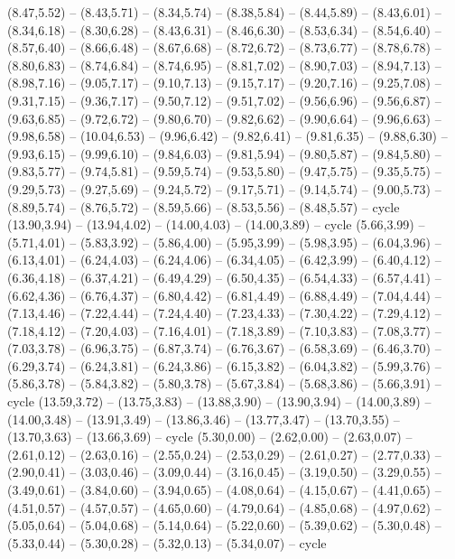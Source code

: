 \expandafter\def\csname geo:gebiet:BLR\endcsname{
  (8.47,5.52) -- (8.43,5.71) -- (8.34,5.74) -- (8.38,5.84) -- (8.44,5.89) -- (8.43,6.01) -- (8.34,6.18) -- (8.30,6.28) -- (8.43,6.31) -- (8.46,6.30) -- (8.53,6.34) -- (8.54,6.40) -- (8.57,6.40) -- (8.66,6.48) -- (8.67,6.68) -- (8.72,6.72) -- (8.73,6.77) -- (8.78,6.78) -- (8.80,6.83) -- (8.74,6.84) -- (8.74,6.95) -- (8.81,7.02) -- (8.90,7.03) -- (8.94,7.13) -- (8.98,7.16) -- (9.05,7.17) -- (9.10,7.13) -- (9.15,7.17) -- (9.20,7.16) -- (9.25,7.08) -- (9.31,7.15) -- (9.36,7.17) -- (9.50,7.12) -- (9.51,7.02) -- (9.56,6.96) -- (9.56,6.87) -- (9.63,6.85) -- (9.72,6.72) -- (9.80,6.70) -- (9.82,6.62) -- (9.90,6.64) -- (9.96,6.63) -- (9.98,6.58) -- (10.04,6.53) -- (9.96,6.42) -- (9.82,6.41) -- (9.81,6.35) -- (9.88,6.30) -- (9.93,6.15) -- (9.99,6.10) -- (9.84,6.03) -- (9.81,5.94) -- (9.80,5.87) -- (9.84,5.80) -- (9.83,5.77) -- (9.74,5.81) -- (9.59,5.74) -- (9.53,5.80) -- (9.47,5.75) -- (9.35,5.75) -- (9.29,5.73) -- (9.27,5.69) -- (9.24,5.72) -- (9.17,5.71) -- (9.14,5.74) -- (9.00,5.73) -- (8.89,5.74) -- (8.76,5.72) -- (8.59,5.66) -- (8.53,5.56) -- (8.48,5.57) -- cycle}
\expandafter\def\csname geo:gebiet:AZE\endcsname{
  (13.90,3.94) -- (13.94,4.02) -- (14.00,4.03) -- (14.00,3.89) -- cycle}
\expandafter\def\csname geo:gebiet:AUT\endcsname{
  (5.66,3.99) -- (5.71,4.01) -- (5.83,3.92) -- (5.86,4.00) -- (5.95,3.99) -- (5.98,3.95) -- (6.04,3.96) -- (6.13,4.01) -- (6.24,4.03) -- (6.24,4.06) -- (6.34,4.05) -- (6.42,3.99) -- (6.40,4.12) -- (6.36,4.18) -- (6.37,4.21) -- (6.49,4.29) -- (6.50,4.35) -- (6.54,4.33) -- (6.57,4.41) -- (6.62,4.36) -- (6.76,4.37) -- (6.80,4.42) -- (6.81,4.49) -- (6.88,4.49) -- (7.04,4.44) -- (7.13,4.46) -- (7.22,4.44) -- (7.24,4.40) -- (7.23,4.33) -- (7.30,4.22) -- (7.29,4.12) -- (7.18,4.12) -- (7.20,4.03) -- (7.16,4.01) -- (7.18,3.89) -- (7.10,3.83) -- (7.08,3.77) -- (7.03,3.78) -- (6.96,3.75) -- (6.87,3.74) -- (6.76,3.67) -- (6.58,3.69) -- (6.46,3.70) -- (6.29,3.74) -- (6.24,3.81) -- (6.24,3.86) -- (6.15,3.82) -- (6.04,3.82) -- (5.99,3.76) -- (5.86,3.78) -- (5.84,3.82) -- (5.80,3.78) -- (5.67,3.84) -- (5.68,3.86) -- (5.66,3.91) -- cycle}
\expandafter\def\csname geo:gebiet:ARM\endcsname{
  (13.59,3.72) -- (13.75,3.83) -- (13.88,3.90) -- (13.90,3.94) -- (14.00,3.89) -- (14.00,3.48) -- (13.91,3.49) -- (13.86,3.46) -- (13.77,3.47) -- (13.70,3.55) -- (13.70,3.63) -- (13.66,3.69) -- cycle}
\expandafter\def\csname geo:gebiet:AND\endcsname{
  }
\expandafter\def\csname geo:gebiet:DZA\endcsname{
  (5.30,0.00) -- (2.62,0.00) -- (2.63,0.07) -- (2.61,0.12) -- (2.63,0.16) -- (2.55,0.24) -- (2.53,0.29) -- (2.61,0.27) -- (2.77,0.33) -- (2.90,0.41) -- (3.03,0.46) -- (3.09,0.44) -- (3.16,0.45) -- (3.19,0.50) -- (3.29,0.55) -- (3.49,0.61) -- (3.84,0.60) -- (3.94,0.65) -- (4.08,0.64) -- (4.15,0.67) -- (4.41,0.65) -- (4.51,0.57) -- (4.57,0.57) -- (4.65,0.60) -- (4.79,0.64) -- (4.85,0.68) -- (4.97,0.62) -- (5.05,0.64) -- (5.04,0.68) -- (5.14,0.64) -- (5.22,0.60) -- (5.39,0.62) -- (5.30,0.48) -- (5.33,0.44) -- (5.30,0.28) -- (5.32,0.13) -- (5.34,0.07) -- cycle}
